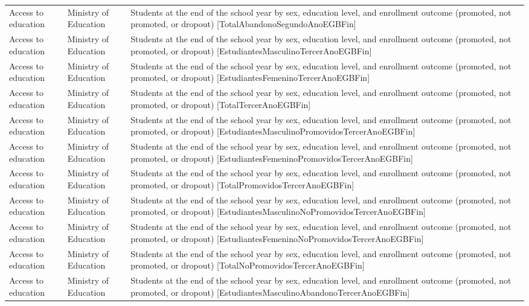 \documentclass[10pt,a4paper]{article}
\begin{document}
\begin{longtable}{@{}>{\raggedright\arraybackslash}p{3.5cm}>{\raggedright\arraybackslash}p{5.6cm}>{\raggedright\arraybackslash}p{\dimexpr\textwidth-9.1cm-4\tabcolsep\relax}@{}}
Access to education & Ministry of Education & Students at the end of the school year by sex, education level, and enrollment outcome (promoted, not promoted, or dropout) [TotalAbandonoSegundoAnoEGBFin]\\
Access to education & Ministry of Education & Students at the end of the school year by sex, education level, and enrollment outcome (promoted, not promoted, or dropout) [EstudiantesMasculinoTercerAnoEGBFin]\\
Access to education & Ministry of Education & Students at the end of the school year by sex, education level, and enrollment outcome (promoted, not promoted, or dropout) [EstudiantesFemeninoTercerAnoEGBFin]\\
Access to education & Ministry of Education & Students at the end of the school year by sex, education level, and enrollment outcome (promoted, not promoted, or dropout) [TotalTercerAnoEGBFin]\\
Access to education & Ministry of Education & Students at the end of the school year by sex, education level, and enrollment outcome (promoted, not promoted, or dropout) [EstudiantesMasculinoPromovidosTercerAnoEGBFin]\\
Access to education & Ministry of Education & Students at the end of the school year by sex, education level, and enrollment outcome (promoted, not promoted, or dropout) [EstudiantesFemeninoPromovidosTercerAnoEGBFin]\\
Access to education & Ministry of Education & Students at the end of the school year by sex, education level, and enrollment outcome (promoted, not promoted, or dropout) [TotalPromovidosTercerAnoEGBFin]\\
Access to education & Ministry of Education & Students at the end of the school year by sex, education level, and enrollment outcome (promoted, not promoted, or dropout) [EstudiantesMasculinoNoPromovidosTercerAnoEGBFin]\\
Access to education & Ministry of Education & Students at the end of the school year by sex, education level, and enrollment outcome (promoted, not promoted, or dropout) [EstudiantesFemeninoNoPromovidosTercerAnoEGBFin]\\
Access to education & Ministry of Education & Students at the end of the school year by sex, education level, and enrollment outcome (promoted, not promoted, or dropout) [TotalNoPromovidosTercerAnoEGBFin]\\
Access to education & Ministry of Education & Students at the end of the school year by sex, education level, and enrollment outcome (promoted, not promoted, or dropout) [EstudiantesMasculinoAbandonoTercerAnoEGBFin]\\

\end{longtable}
\end{document}

